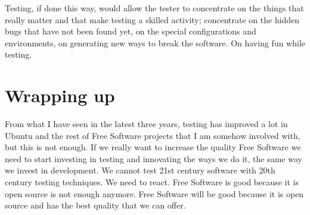 Testing, if done this way, would allow the tester to concentrate on the things
that really matter and that make testing a skilled activity; concentrate on the
hidden bugs that have not been found yet, on the special configurations and
environments, on generating new ways to break the software. On having fun while
testing.

\section*{Wrapping up}

From what I have seen in the latest three years, testing has improved a lot in
Ubuntu and the rest of Free Software projects that I am somehow involved with, but this
is not enough. If we really want to increase the quality Free Software
we need to start investing in testing and innovating the ways we do it, the same
way we invest in development. We cannot test 21st century software with 20th
century testing techniques. We need to react. Free Software is good because it is
open source is not enough anymore. Free Software will be good because it is open
source and has the best quality that we can offer.
